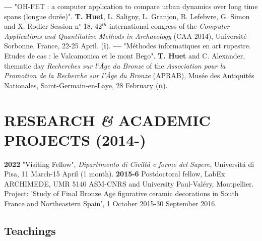 \documentclass{article}
\begin{document}
\smallbreak
\textbf{--- }"OH-FET : a computer application to compare urban dynamics over long time spans (longue dur\'{e}e)". \textbf{T. Huet}, L. Saligny, L. Granjon, B. Lefebvre, G. Simon and X. Rodier Session n$\mathrm{{}^\circ}$ 18, 42${}^{th}$ international congress of the \textit{Computer Applications and Quantitative Methods in Archaeology} (CAA 2014), Universit\'{e} Sorbonne, France, 22-25 April. (\textbf{i}).
\smallbreak
\textbf{--- }"M\'{e}thodes informatiques en art rupestre. Etudes de cas : le Valcamonica et le mont Bego". \textbf{T. Huet} and C. Alexander, thematic day \textit{Recherches sur l'\^{A}ge du Bronze }of the\textit{ Association pour la Promotion de la Recherche sur l'\^{A}ge du Bronze }(APRAB), Mus\'{e}e des Antiquit\'{e}s Nationales, Saint-Germain-en-Laye, 28 February (\textbf{n}).

\section{RESEARCH \textit{\&} ACADEMIC PROJECTS (2014-)}

\textbf{2022 }"Visiting Fellow", \textit{Dipartimento di Civilt\'{a} e forme del Sapere}, Universit\'{a} di Pisa, 11 March-15 April (1 month).
\smallbreak
\textbf{2015-6 }Postdoctoral fellow, LabEx ARCHIMEDE, UMR 5140 ASM-CNRS and University Paul-Val\'{e}ry, Montpellier. Project: 'Study of Final Bronze Age figurative ceramic decorations in South France and Northeastern Spain', 1 October 2015-30 September 2016.
\smallbreak

\subsection*{Teachings}
\end{document}
